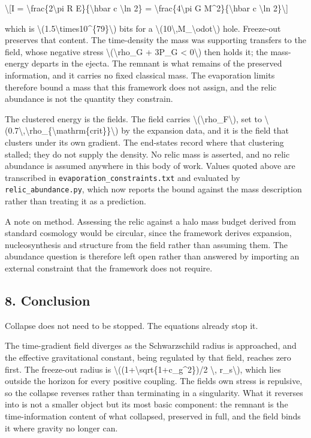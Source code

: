 \documentclass[
  10pt,
]{article}
\begin{document}
\textbackslash{[}I = \textbackslash frac\{2\textbackslash pi R
E\}\{\textbackslash hbar c \textbackslash ln 2\} =
\textbackslash frac\{4\textbackslash pi G M\^{}2\}\{\textbackslash hbar
c \textbackslash ln 2\}\textbackslash{]}

which is
\textbackslash(1.5\textbackslash times10\^{}\{79\}\textbackslash) bits
for a
\textbackslash(10\textbackslash,M\_\textbackslash odot\textbackslash)
hole. Freeze-out preserves that content. The time-density the mass was
supporting transfers to the field, whose negative stress
\textbackslash(\textbackslash rho\_G + 3P\_G \textless{}
0\textbackslash) then holds it; the mass-energy departs in the ejecta.
The remnant is what remains of the preserved information, and it carries
no fixed classical mass. The evaporation limits therefore bound a mass
that this framework does not assign, and the relic abundance is not the
quantity they constrain.

The clustered energy is the field\textquotesingle s. The field carries
\textbackslash(\textbackslash rho\_F\textbackslash), set to
\textbackslash(0.7\textbackslash,\textbackslash rho\_\{\textbackslash mathrm\{crit\}\}\textbackslash)
by the expansion data, and it is the field that clusters under its own
gradient. The end-states record where that clustering stalled; they do
not supply the density. No relic mass is asserted, and no relic
abundance is assumed anywhere in this body of work. Values quoted above
are transcribed in \texttt{evaporation\_constraints.txt} and evaluated
by \texttt{relic\_abundance.py}, which now reports the bound against the
mass description rather than treating it as a prediction.

A note on method. Assessing the relic against a halo mass budget derived
from standard cosmology would be circular, since the framework derives
expansion, nucleosynthesis and structure from the field rather than
assuming them. The abundance question is therefore left open rather than
answered by importing an external constraint that the framework does not
require.

\hypertarget{conclusion}{%
\subsection{8. Conclusion}\label{conclusion}}

Collapse does not need to be stopped. The equations already stop it.

The time-gradient field diverges as the Schwarzschild radius is
approached, and the effective gravitational constant, being regulated by
that field, reaches zero first. The freeze-out radius is
\textbackslash((1+\textbackslash sqrt\{1+c\_g\^{}2\})/2 \textbackslash,
r\_s\textbackslash), which lies outside the horizon for every positive
coupling. The field\textquotesingle s own stress is repulsive, so the
collapse reverses rather than terminating in a singularity. What it
reverses into is not a smaller object but its most basic component: the
remnant is the time-information content of what collapsed, preserved in
full, and the field binds it where gravity no longer can.
\end{document}
